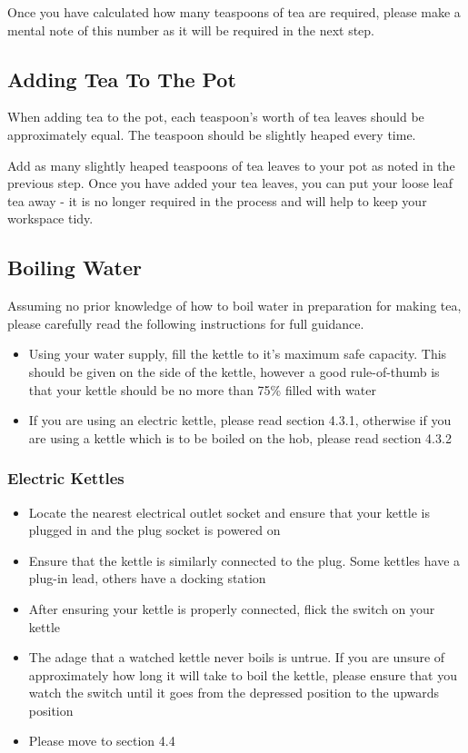 \documentclass{article}
\begin{document}
Once you have calculated how many teaspoons of tea are required, please make a mental note of this number as it will be required in the next step.

\subsection{Adding Tea To The Pot}
When adding tea to the pot, each teaspoon's worth of tea leaves should be approximately equal. The teaspoon should be slightly heaped every time.

\bigskip\noindent
Add as many slightly heaped teaspoons of tea leaves to your pot as noted in the previous step. Once you have added your tea leaves, you can put your loose leaf tea away - it is no longer required in the process and will help to keep your workspace tidy.

\subsection{Boiling Water}
Assuming no prior knowledge of how to boil water in preparation for making tea, please carefully read the following instructions for full guidance.
\begin{itemize}
\item Using your water supply, fill the kettle to it's maximum safe capacity. This should be given on the side of the kettle, however a good rule-of-thumb is that your kettle should be no more than 75\% filled with water
\item If you are using an electric kettle, please read section 4.3.1, otherwise if you are using a kettle which is to be boiled on the hob, please read section 4.3.2
\end{itemize}
\subsubsection{Electric Kettles}
\begin{itemize}
\item Locate the nearest electrical outlet socket and ensure that your kettle is plugged in and the plug socket is powered on
\item Ensure that the kettle is similarly connected to the plug. Some kettles have a plug-in lead, others have a docking station
\item After ensuring your kettle is properly connected, flick the switch on your kettle
\item The adage that a watched kettle never boils is untrue. If you are unsure of approximately how long it will take to boil the kettle, please ensure that you watch the switch until it goes from the depressed position to the upwards position
\item Please move to section 4.4
\end{itemize}
\end{document}
